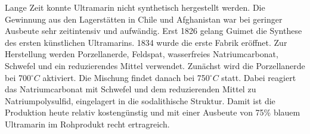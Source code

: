 Lange Zeit konnte Ultramarin nicht synthetisch hergestellt werden. Die Gewinnung aus den Lagerstätten in Chile und Afghanistan war bei geringer Ausbeute sehr zeitintensiv und aufwändig. Erst 1826 gelang Guimet die Synthese des ersten künstlichen Ultramarins. 1834 wurde die erste Fabrik eröffnet. Zur Herstellung werden Porzellanerde, Feldspat, wasserfreies Natriumcarbonat, Schwefel und ein reduzierendes Mittel verwendet. Zunächst wird die Porzellanerde bei 700$^{\circ}C$ aktiviert. Die Mischung findet danach bei 750$^{\circ}C$ statt. Dabei reagiert das Natriumcarbonat mit Schwefel und dem reduzierenden Mittel zu Natriumpolysulfid, eingelagert in die sodalithische Struktur. Damit ist die Produktion heute relativ kostengünstig und mit einer Ausbeute von 75\% blauem Ultramarin im Rohprodukt recht ertragreich. 
\cite{Buxbaum, Seel}
